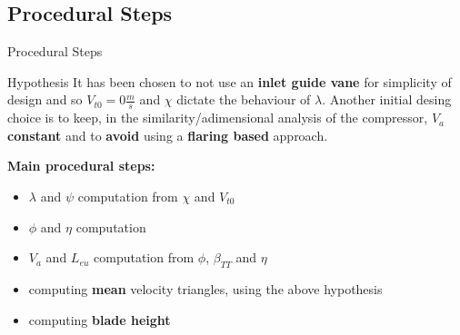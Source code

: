 \subsection{Procedural Steps}
	\begin{frame}{Procedural Steps}
	\begin{alertblock}{Hypothesis}
		It has been chosen to not use an \textbf{inlet guide vane} for simplicity of design and so $V_{t0} = 0 \frac{m}{s}$ and $\chi$ dictate the behaviour of $\lambda$. Another initial desing choice is to keep, in the similarity/adimensional analysis of the compressor, $V_a$ \textbf{constant} and to \textbf{avoid} using a \textbf{flaring based} approach.
	\end{alertblock}
	\textbf{Main procedural steps:}
	\begin{itemize}
		\item $\lambda$ and $\psi$ computation from $\chi$ and $V_{t0}$
		\item $\phi$ and $\eta$ computation 
		\item $V_a$ and $L_{eu}$ computation from $\phi$, $\beta_{TT}$ and $\eta$
		\item computing \textbf{mean} velocity triangles, using the above hypothesis
		\item computing \textbf{blade height}
	\end{itemize}
	\end{frame}
